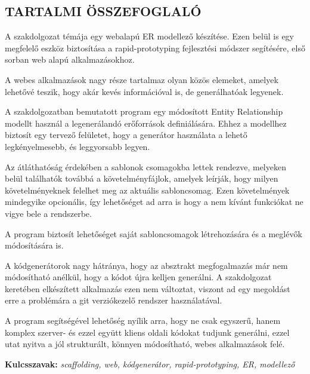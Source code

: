 \sectionfont{\centering}
\begin{center}
\section*{\textbf{\Large \MakeUppercase{\textrm{Tartalmi összefoglaló}}}}
\end{center}

\begin{justify}
A szakdolgozat témája egy webalapú ER modellező készítése. Ezen belül is egy megfelelő eszköz biztosítása a rapid-prototyping fejlesztési módszer segítésére, első sorban web alapú alkalmazásokhoz.

A webes alkalmazások nagy része tartalmaz olyan közös elemeket, amelyek lehetővé teszik, hogy akár kevés információval is, de generálhatóak legyenek.

A szakdolgozatban bemutatott program egy módosított Entity Relationship modellt használ a legenerálandó erőforrások definiálására. Ehhez a modellhez biztosít egy tervező felületet, hogy a generátor használata a lehető legkényelmesebb, és leggyorsabb legyen.

Az átláthatóság érdekében a sablonok csomagokba lettek rendezve, melyeken belül találhatók továbbá a követelményfájlok, amelyek leírják, hogy milyen követelményeknek felelhet meg az aktuális sabloncsomag. Ezen követelmények mindegyike opcionális, így lehetőséget ad arra is hogy a nem kívánt funkciókat ne vigye bele a rendszerbe.

A program  biztosít lehetőséget saját sabloncsomagok létrehozására és a meglévők módosítására is.

A kódgenerátorok nagy hátránya, hogy az absztrakt megfogalmazás már nem módosítható anélkül, hogy a kódot újra kelljen generálni. A szakdolgozat keretében elkészített alkalmazás ezen nem változtat, viszont ad egy megoldást erre a problémára a git verziókezelő rendszer használatával. 

A program segítségével lehetőség nyílik arra, hogy ne csak egyszerű, hanem komplex szerver- és ezzel együtt kliens oldali kódokat tudjunk generálni, ezzel utat nyitva a jól strukturált, könnyen módosítható, webes alkalmazások felé.
\end{justify}

\vspace{2cm}

{\bf Kulcsszavak:} {\it scaffolding, web, kódgenerátor, rapid-prototyping, ER, modellező}
